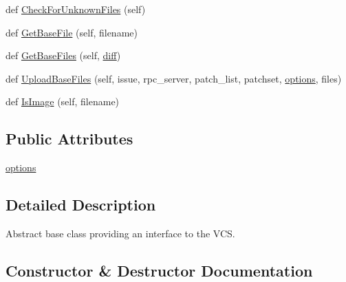 \begin{DoxyCompactItemize}
\item 
def \mbox{\hyperlink{classupload_1_1_version_control_system_ad2923d691a1b1047e9359c5b7c1c103f}{Check\+For\+Unknown\+Files}} (self)
\item 
def \mbox{\hyperlink{classupload_1_1_version_control_system_adfd9d4ecba422102233a2ba13e5bfaf5}{Get\+Base\+File}} (self, filename)
\item 
def \mbox{\hyperlink{classupload_1_1_version_control_system_a812c3b3daf90c88b015fa4b26252e291}{Get\+Base\+Files}} (self, \mbox{\hyperlink{_mutual_8cpp_ae6c31fc00bc7f0cfda97440db3377063}{diff}})
\item 
def \mbox{\hyperlink{classupload_1_1_version_control_system_a7e334f967301b9e85e5a9c39f5036823}{Upload\+Base\+Files}} (self, issue, rpc\+\_\+server, patch\+\_\+list, patchset, \mbox{\hyperlink{classupload_1_1_version_control_system_a4d57d043bc408887b94269fe4cea9556}{options}}, files)
\item 
def \mbox{\hyperlink{classupload_1_1_version_control_system_a846889ecd2ef40870b456ddb5b349e02}{Is\+Image}} (self, filename)
\end{DoxyCompactItemize}
\subsection*{Public Attributes}
\begin{DoxyCompactItemize}
\item 
\mbox{\hyperlink{classupload_1_1_version_control_system_a4d57d043bc408887b94269fe4cea9556}{options}}
\end{DoxyCompactItemize}


\subsection{Detailed Description}
\begin{DoxyVerb}Abstract base class providing an interface to the VCS.\end{DoxyVerb}
 

\subsection{Constructor \& Destructor Documentation}
\mbox{\label{classupload_1_1_version_control_system_ace97e5785a2b40011404ae6fbb956ecf}} 
